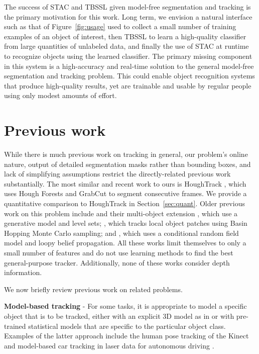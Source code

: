 \documentclass[graybox]{svmult}
\begin{document}
The success of STAC and TBSSL given model-free segmentation and tracking is the primary motivation for this work.  Long term, we envision a natural interface such as that of Figure~\ref{fig:usage} used to collect a small number of training examples of an object of interest, then TBSSL to learn a high-quality classifier from large quantities of unlabeled data, and finally the use of STAC at runtime to recognize objects using the learned classifier.  The primary missing component in this system is a high-accuracy and real-time solution to the general model-free segmentation and tracking problem.  This could enable object recognition systems that produce high-quality results, yet are trainable and usable by regular people using only modest amounts of effort.


\section{Previous work}
\label{sec:prev_work}

While there is much previous work on tracking in general, our problem's online nature, output of detailed segmentation masks rather than bounding boxes, and lack of simplifying assumptions restrict the directly-related previous work substantially.  The most similar and recent work to ours is HoughTrack \cite{godec2011a}, which uses Hough Forests and GrabCut to segment consecutive frames.  We provide a quantitative comparison to HoughTrack in Section~\ref{sec:quant}.  Older previous work on this problem include \cite{bibby2008a} and their multi-object extension \cite{bibby2010a}, which use a generative model and level sets; \cite{kwon2009a}, which tracks local object patches using Basin Hopping Monte Carlo sampling; and \cite{ren2007a}, which uses a conditional random field model and loopy belief propagation. All these works limit themselves to only a small number of features and do not use learning methods to find the best general-purpose tracker.  Additionally, none of these works consider depth information.

We now briefly review previous work on related problems.

\textbf{Model-based tracking} - For some tasks, it is appropriate to model a specific object that is to be tracked, either with an explicit 3D model as in \cite{prisacariu2009a} or with pre-trained statistical models that are specific to the particular object class.  Examples of the latter approach include the human pose tracking of the Kinect \cite{shotton2011a} and model-based car tracking in laser data for autonomous driving \cite{petrovskaya2009a}.
\end{document}

